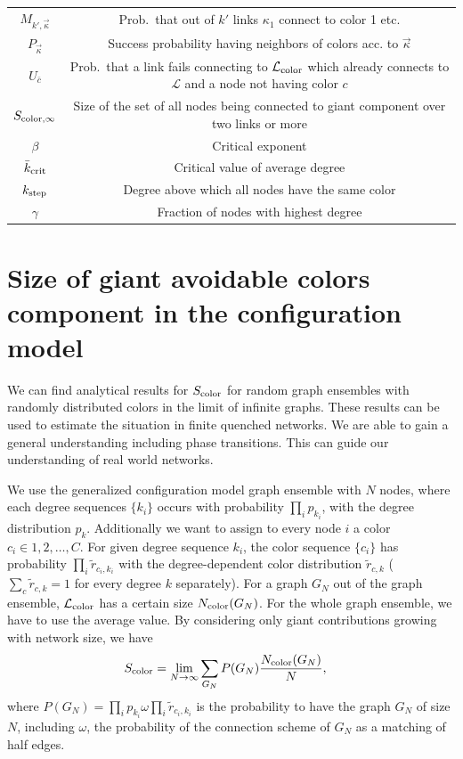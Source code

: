 \documentclass[aps, pre, onecolumn, a4paper, floatfix]{revtex4}
\begin{document}
{\begin{tabular}{ c c }
 $M_{k',\vec \kappa}$ & Prob.\ that out of $k'$ links $\kappa_1$ connect to color 1 etc. \\
 $P_{\vec \kappa}$ & Success probability having neighbors of colors acc. to $\vec \kappa$ \\
 $U_{\bar c}$ & Prob.\ that a link fails connecting to ${\mathcal L}_{\rm color}$ which already connects to ${\mathcal L}$ and 
 a node not having color $c$\\
 $S_{{\rm color},\infty}$ & Size of the set of all nodes being connected to giant component over two links or more \\
 \hline
 \hline
 $\beta$ & Critical exponent \\
 ${\bar k}_{\rm crit}$ & Critical value of average degree \\
 $k_{\rm step}$ & Degree above which all nodes have the same color \\
 $\gamma$ & Fraction of nodes with highest degree \\
\end{tabular}

}



\pagebreak

\section{Size of giant avoidable colors component in the configuration model}

We can find analytical results for $S_{\rm color}$ for random graph ensembles 
with randomly distributed colors in the limit of infinite graphs. 
These results can be used to estimate the situation in finite quenched networks. 
We are able to gain a general understanding including phase transitions. 
This can guide our understanding of real world networks. 

We use the generalized configuration model graph ensemble with $N$ nodes, 
where each degree sequences $\{k_i\}$ occurs with probability $\prod_i p_{k_i}$, 
with the degree distribution $p_{k}$. 
Additionally we want to assign to every node $i$ a color $c_i\in 1,2,\dots,C$. 
For given degree sequence $k_i$, 
the color sequence $\{c_i\}$ has probability $\prod_i {\tilde r}_{c_i,k_i}$ 
with the degree-dependent color distribution ${\tilde r}_{c,k}$ 
($\sum_c {\tilde r}_{c,k}=1$ for every degree $k$ separately). 
For a graph $G_N$ out of the graph ensemble, 
$\mathcal{L}_{\rm color}$ has a certain size $N_{\rm color}(G_N)$. 
For the whole graph ensemble, we have to use the average value. 
By considering only giant contributions growing with network size, 
we have
\begin{align}
S_{\rm color} &= \lim_{N\to \infty}\sum_{G_N} P(G_N) \frac{N_{\rm color}(G_N)}{N},
\end{align}
where $P(G_N)=\prod_i p_{k_i} \omega \prod_i {\tilde r}_{c_i,k_i}$ is the probability 
to have the graph $G_N$ of size $N$, including $\omega$, 
the probability of the connection scheme of $G_N$ as a matching of half edges. 
\end{document}
